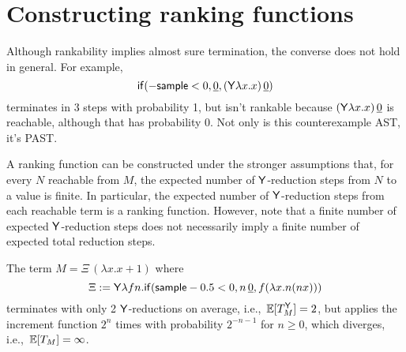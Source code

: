 \section{Constructing ranking functions}
\label{sec:ranking}

Although rankability implies almost sure termination, the converse does not hold in general. For example,
\begin{equation}
\tif{{-}\tsample < 0}{\underline{0}}{(\tY \lambda x. x) \, \underline 0}
\label{ex:0 probability reachable}
\end{equation}
terminates in 3 steps with probability 1, but isn't rankable because $(\mathsf{Y} \lambda x. x) \, \underline 0$ is reachable, although that has probability 0. 
Not only is this counterexample AST, it's PAST. %

A ranking function can be constructed under the stronger assumptions that, for every $N$ reachable from $M$, the expected number of $\mathsf{Y}$-reduction steps from $N$ to a value is finite. 
In particular, the expected number of $\mathsf{Y}$-reduction steps from each reachable term is a ranking function. 
However, note that a finite number of expected $\mathsf{Y}$-reduction steps does not necessarily imply a finite number of expected total reduction steps.

\begin{example}
\label{ex:tY finite does not imply t finite}
The term $M = \Xi \, (\lambda x. x+1)$ where
\[
\Xi := \mathsf{Y} \lambda f n. \mathsf{if}(\mathsf{sample} - 0.5 < 0, n \, \underline 0, f (\lambda x. n (n x)))
\] 
terminates with only 2 $\mathsf{Y}$-reductions on average, i.e.,~$\mathbb{E}[T_M^{\mathsf{Y}}] = 2$, but applies the increment function $2^n$ times with probability $2^{-n-1}$ for $n \geq 0$, which diverges, i.e.,~$\mathbb{E}[T_M] = \infty$.
\end{example}

